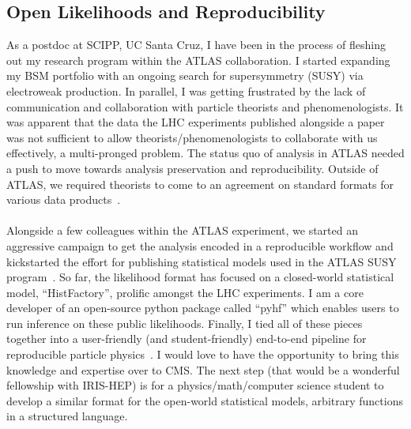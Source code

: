 \documentclass[10pt,a4paper,sans]{moderncv} %
\begin{document}
\subsection{Open Likelihoods and Reproducibility}
As a postdoc at SCIPP, UC Santa Cruz, I have been in the process of fleshing out my research program within the ATLAS collaboration. I started expanding my BSM portfolio with an ongoing search for supersymmetry (SUSY) via electroweak production. In parallel, I was getting frustrated by the lack of communication and collaboration with particle theorists and phenomenologists. It was apparent that the data the LHC experiments published alongside a paper was not sufficient to allow theorists/phenomenologists to collaborate with us effectively, a multi-pronged problem. The status quo of analysis in ATLAS needed a push to move towards analysis preservation and reproducibility. Outside of ATLAS, we required theorists to come to an agreement on standard formats for various data products~\cite{Cranmer:2021urp, Heinrich2021}.
\\
\\
Alongside a few colleagues within the ATLAS experiment, we started an aggressive campaign to get the analysis encoded in a reproducible workflow and kickstarted the effort for publishing statistical models used in the ATLAS SUSY program~\cite{ATL-PHYS-PUB-2019-029}. So far, the likelihood format has focused on a closed-world statistical model, ``HistFactory'', prolific amongst the LHC experiments. I am a core developer of an open-source python package called ``pyhf'' which enables users to run inference on these public likelihoods. Finally, I tied all of these pieces together into a user-friendly (and student-friendly) end-to-end pipeline for reproducible particle physics~\cite{Stark:2023ont}. I would love to have the opportunity to bring this knowledge and expertise over to CMS. The next step (that would be a wonderful fellowship with IRIS-HEP) is for a physics/math/computer science student to develop a similar format for the open-world statistical models, arbitrary functions in a structured language.
\end{document}

